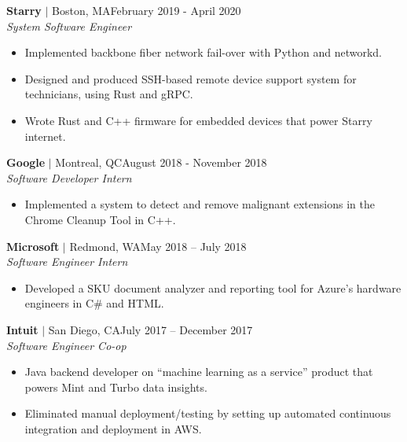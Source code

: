 \documentclass[overlapped,line]{res}
\begin{document}
\begin{resume}
\textbf{Starry} $|$ Boston, MA\hfill February 2019 - April 2020\\
{\sl System Software Engineer}
\begin{itemize} \itemsep -2pt
    \item Implemented backbone fiber network fail-over with Python and networkd.
    \item Designed and produced SSH-based remote device support system for
	    technicians, using Rust and gRPC.
    \item Wrote Rust and C++ firmware for embedded devices that power Starry
	    internet.
\end{itemize}

\textbf{Google} $|$ Montreal, QC\hfill August 2018 - November 2018\\
{\sl Software Developer Intern}
\begin{itemize} \itemsep -2pt
    \item Implemented a system to detect and remove malignant extensions in the Chrome Cleanup
		Tool in C++.%
\end{itemize}

\textbf{Microsoft} $|$ Redmond, WA\hfill May 2018 \--- July 2018\\
{\sl Software Engineer Intern}
\begin{itemize} \itemsep -2pt
	\item Developed a SKU document analyzer and reporting tool for Azure's
		hardware engineers in C\# and HTML.
\end{itemize}

\textbf{Intuit} $|$ San Diego, CA\hfill July 2017 \--- December 2017\\
{\sl Software Engineer Co-op}
\begin{itemize} \itemsep -2pt
	\item Java backend developer on ``machine learning as a service''
		product that powers Mint and Turbo data insights.
	\item Eliminated manual deployment/testing by setting up automated
      continuous integration and deployment in AWS.
\end{itemize}


\end{resume}
\end{document}
